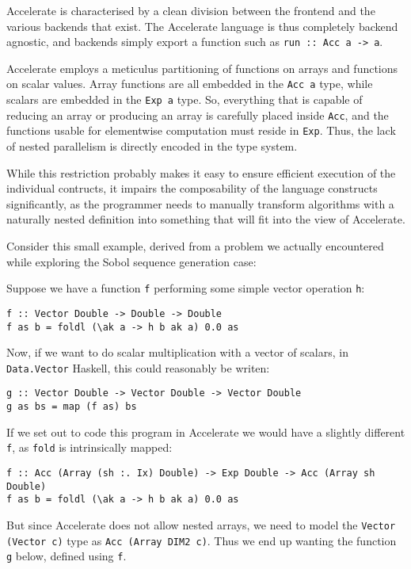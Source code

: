 Accelerate is characterised by a clean division between the frontend and the
various backends that exist. The Accelerate language is thus completely backend
agnostic, and backends simply export a function such as \hbox{\texttt{run :: Acc a ->
a}.}

Accelerate employs a meticulus partitioning of functions on arrays and functions
on scalar values. Array functions are all embedded in the \texttt{Acc a} type,
while scalars are embedded in the \texttt{Exp a} type. So, everything that is
capable of reducing an array or producing an array is carefully placed inside
\texttt{Acc}, and the functions usable for elementwise computation must
reside in \texttt{Exp}. Thus, the lack of nested parallelism is directly
encoded in the type system.

While this restriction probably makes it easy to ensure efficient execution of
the individual contructs, it impairs the composability of the language
constructs significantly, as the programmer needs to manually transform
algorithms with a naturally nested definition into something that will fit into
the view of Accelerate.

Consider this small example, derived from a problem we actually encountered
while exploring the Sobol sequence generation case:

Suppose we have a function \texttt{f} performing some simple vector operation \texttt{h}:

\begin{verbatim}
f :: Vector Double -> Double -> Double
f as b = foldl (\ak a -> h b ak a) 0.0 as
\end{verbatim}

Now, if we want to do scalar multiplication with a vector of scalars, in
\texttt{Data.Vector} Haskell, this could reasonably be writen:

\begin{verbatim}
g :: Vector Double -> Vector Double -> Vector Double
g as bs = map (f as) bs
\end{verbatim}

If we set out to code this program in Accelerate we would have a slightly different
\texttt{f}, as \texttt{fold} is intrinsically mapped:

\begin{verbatim}
f :: Acc (Array (sh :. Ix) Double) -> Exp Double -> Acc (Array sh Double)
f as b = foldl (\ak a -> h b ak a) 0.0 as
\end{verbatim}

But since Accelerate does not allow nested arrays, we need to model the
\texttt{Vector (Vector c)} type  as \texttt{Acc (Array DIM2 c)}. Thus we end up
wanting the function \texttt{g} below, defined using \texttt{f}.

